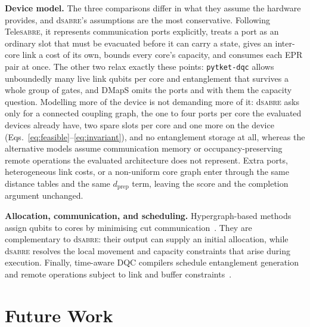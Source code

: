 \documentclass[journal]{IEEEtran}
\newcommand{\dSABRE}{d\textsc{sabre}}
\newcommand{\TeleSABRE}{Tele\textsc{sabre}}
\begin{document}
\textbf{Device model.}
The three comparisons differ in what they assume the hardware provides, and
\dSABRE{}'s assumptions are the most conservative. Following \TeleSABRE{}, it
represents communication ports explicitly, treats a port as an ordinary slot
that must be evacuated before it can carry a state, gives an inter-core link
a cost of its own, bounds every core's capacity, and consumes each EPR pair
at once. The other two relax exactly these points: \texttt{pytket-dqc} allows
unboundedly many live link qubits per core and entanglement that survives a
whole group of gates, and DMapS omits the ports and with them the capacity
question. Modelling more of the device is not demanding more of it:
\dSABRE{} asks only for a connected coupling graph, the one to four ports
per core the evaluated devices already have, two spare slots per core and
one more on the device (Eqs.~\eqref{eq:feasible}--\eqref{eq:invariant}),
and no entanglement storage at all, whereas the alternative models assume
communication memory or occupancy-preserving remote operations the
evaluated architecture does not represent. Extra ports, heterogeneous link
costs, or a non-uniform core graph enter through the same distance tables and
the same $d_{\mathrm{prep}}$ term, leaving the score and the completion
argument unchanged.

\textbf{Allocation, communication, and scheduling.}
Hypergraph-based methods assign qubits to cores by minimising cut
communication~\cite{andres2019automated,pytketdqc2024}. They are
complementary to \dSABRE{}: their output can supply an initial allocation,
while \dSABRE{} resolves the local movement and capacity constraints that
arise during execution. Finally,
time-aware DQC compilers schedule entanglement generation and remote
operations subject to link and buffer constraints~\cite{baker2020time,ferrari2021compiler}.

\section{Future Work}
\label{sec:future}
\end{document}
